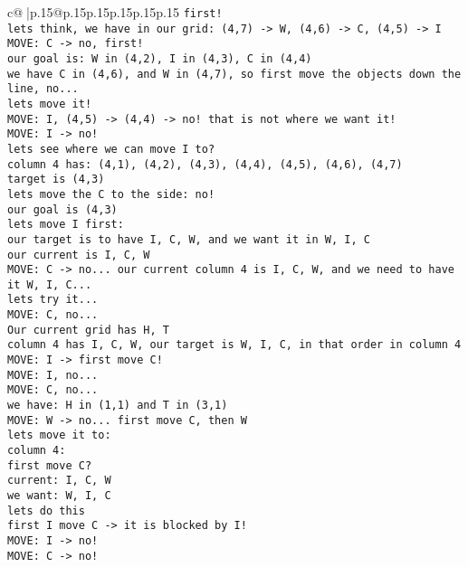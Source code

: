 \documentclass{article}
\begin{document}
{\begin{supertabular}{c@{$\;$}|p{.15\linewidth}@{}p{.15\linewidth}p{.15\linewidth}p{.15\linewidth}p{.15\linewidth}p{.15\linewidth}}
{{{\tt  first!\\ \tt  lets think, we have in our grid: (4,7) -> W, (4,6) -> C, (4,5) -> I \\ \tt  MOVE: C -> no, first!\\ \tt  our goal is: W in (4,2), I in (4,3), C in (4,4)\\ \tt  we have C in (4,6), and W in (4,7), so first move the objects down the line, no...\\ \tt  lets move it!\\ \tt  MOVE: I, (4,5) -> (4,4) -> no! that is not where we want it!\\ \tt  MOVE: I -> no! \\ \tt lets see where we can move I to? \\ \tt  column 4 has: (4,1), (4,2), (4,3), (4,4), (4,5), (4,6), (4,7) \\ \tt  target is (4,3) \\ \tt  lets move the C to the side: no!\\ \tt  our goal is (4,3) \\ \tt  lets move I first: \\ \tt   our target is to have I, C, W, and we want it in W, I, C \\ \tt  our current is I, C, W\\ \tt  MOVE: C -> no... our current column 4 is I, C, W, and we need to have it W, I, C...\\ \tt  lets try it...\\ \tt  MOVE: C, no... \\ \tt   Our current grid has H, T \\ \tt  column 4 has I, C, W, our target is W, I, C, in that order in column 4 \\ \tt  MOVE: I -> first move C!\\ \tt  MOVE: I, no...\\ \tt  MOVE: C, no...\\ \tt  we have: H in (1,1) and T in (3,1) \\ \tt  MOVE: W -> no... first move C, then W\\ \tt  lets move it to: \\ \tt  column 4: \\ \tt  first move C?\\ \tt  current: I, C, W \\ \tt  we want: W, I, C \\ \tt  lets do this \\ \tt  first I move C -> it is blocked by I!\\ \tt  MOVE: I -> no! \\ \tt  MOVE: C -> no! \\ }}}
\end{supertabular}}
\end{document}
